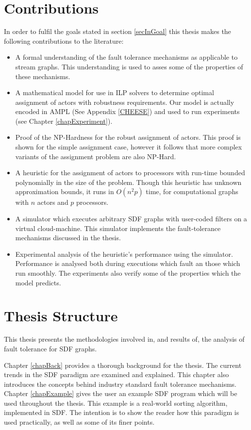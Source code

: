 \section{Contributions}

In order to fulfil the goals stated in section \ref{secInGoal} this thesis makes the following contributions to the literature:

\begin{itemize}
	\item A formal understanding of the fault tolerance mechanisms as applicable to stream graphs.
			This understanding is used to asses some of the properties of these mechanisms.
	\item A mathematical model for use in ILP solvers to determine optimal assignment of actors with robustness requirements.
			Our model is actually encoded in AMPL (See Appendix \ref{CHEESE}) and used to run experiments (see Chapter \ref{chapExperiment}).
	\item Proof of the NP-Hardness for the robust assignment of actors.
			This proof is shown for the simple assignment case, however it follows that more complex variants of the assignment problem are also NP-Hard.
	\item A heuristic for the assignment of actors to processors with run-time bounded polynomially in the size of the problem.
			Though this heuristic has unknown approximation bounds, it runs in $O(n^2 p)$ time, for computational graphs with $n$ actors and $p$ processors.
	\item A simulator which executes arbitrary SDF graphs with user-coded filters on a virtual cloud-machine.
			This simulator implements the fault-tolerance mechanisms discussed in the thesis.
	\item Experimental analysis of the heuristic's performance using the simulator.
			Performance is analysed both during executions which fault an those which run smoothly.
			The experiments also verify some of the properties which the model predicts.
\end{itemize}

\section{Thesis Structure}

This thesis presents the methodologies involved in, and results of, the analysis of fault tolerance for SDF graphs.

Chapter \ref{chapBack} provides a thorough background for the thesis.
The current trends in the SDF paradigm are examined and explained.
This chapter also introduces the concepts behind industry standard fault tolerance mechanisms.
Chapter \ref{chapExample} gives the user an example SDF program which will be used throughout the thesis.
This example is a real-world sorting algorithm, implemented in SDF.
The intention is to show the reader how this paradigm is used practically, as well as some of its finer points.

